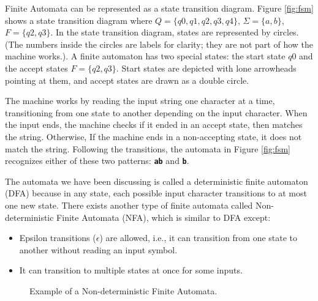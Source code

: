 Finite Automata can be represented as a state transition diagram. Figure \ref{fig:fsm} shows a state transition diagram where $Q = \{q0, q1, q2, q3, q4\}$, $\Sigma = \{a, b\}$, $F = \{q2, q3\}$. In the state transition diagram, states are represented by circles. (The numbers inside the circles are labels for clarity; they are not part of how the machine works.). A finite automaton has two special states: the start state $q0$ and the accept states $F = \{q2, q3\}$. Start states are depicted with lone arrowheads pointing at them, and accept states are drawn as a double circle.

The machine works by reading the input string one character at a time, transitioning from one state to another depending on the input character. When the input ends, the machine checks if it ended in an accept state, then matches the string. Otherwise, If the machine ends in a non-accepting state, it does not match the string. Following the transitions, the automata in Figure \ref{fig:fsm} recognizes either of these two patterns: \texttt{\textbf{ab}} and \texttt{\textbf{b}}.

The automata we have been discussing is called a deterministic finite automaton (DFA) because in any state, each possible input character transitions to at most one new state. There exists another type of finite automata called Non-deterministic Finite Automata (NFA), which is similar to DFA except:

\begin{itemize}
    \item Epsilon transitions ($\epsilon$) are allowed, i.e., it can transition from one state to another without reading an input symbol.
    \item It can transition to multiple states at once for some inputs.
\end{itemize}

\begin{figure}[H]
\centering
{}
\caption{Example of a Non-deterministic Finite Automata.}
\label{fig:nfafsm}
\end{figure}

